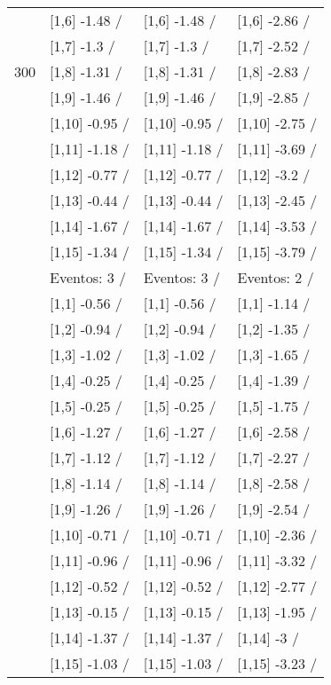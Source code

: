 \begin{table}
\begin{tabular}[t]{llll}
 & {}[1,6] -1.48  / & {}[1,6] -1.48  / & {}[1,6] -2.86  /\\
 & {}[1,7] -1.3  / & {}[1,7] -1.3  / & {}[1,7] -2.52  /\\
300 & {}[1,8] -1.31  / & {}[1,8] -1.31  / & {}[1,8] -2.83  /\\
\addlinespace
 & {}[1,9] -1.46  / & {}[1,9] -1.46  / & {}[1,9] -2.85  /\\
 & {}[1,10] -0.95  / & {}[1,10] -0.95  / & {}[1,10] -2.75  /\\
 & {}[1,11] -1.18  / & {}[1,11] -1.18  / & {}[1,11] -3.69  /\\
 & {}[1,12] -0.77  / & {}[1,12] -0.77  / & {}[1,12] -3.2  /\\
 & {}[1,13] -0.44  / & {}[1,13] -0.44  / & {}[1,13] -2.45  /\\
\addlinespace
 & {}[1,14] -1.67  / & {}[1,14] -1.67  / & {}[1,14] -3.53  /\\
 & {}[1,15] -1.34  / & {}[1,15] -1.34  / & {}[1,15] -3.79  /\\
 & Eventos:  3 / & Eventos:  3 / & Eventos:  2 /\\
 & {}[1,1] -0.56  / & {}[1,1] -0.56  / & {}[1,1] -1.14  /\\
 & {}[1,2] -0.94  / & {}[1,2] -0.94  / & {}[1,2] -1.35  /\\
\addlinespace
 & {}[1,3] -1.02  / & {}[1,3] -1.02  / & {}[1,3] -1.65  /\\
 & {}[1,4] -0.25  / & {}[1,4] -0.25  / & {}[1,4] -1.39  /\\
 & {}[1,5] -0.25  / & {}[1,5] -0.25  / & {}[1,5] -1.75  /\\
 & {}[1,6] -1.27  / & {}[1,6] -1.27  / & {}[1,6] -2.58  /\\
 & {}[1,7] -1.12  / & {}[1,7] -1.12  / & {}[1,7] -2.27  /\\
\addlinespace
500 & {}[1,8] -1.14  / & {}[1,8] -1.14  / & {}[1,8] -2.58  /\\
 & {}[1,9] -1.26  / & {}[1,9] -1.26  / & {}[1,9] -2.54  /\\
 & {}[1,10] -0.71  / & {}[1,10] -0.71  / & {}[1,10] -2.36  /\\
 & {}[1,11] -0.96  / & {}[1,11] -0.96  / & {}[1,11] -3.32  /\\
 & {}[1,12] -0.52  / & {}[1,12] -0.52  / & {}[1,12] -2.77  /\\
\addlinespace
 & {}[1,13] -0.15  / & {}[1,13] -0.15  / & {}[1,13] -1.95  /\\
 & {}[1,14] -1.37  / & {}[1,14] -1.37  / & {}[1,14] -3  /\\
 & {}[1,15] -1.03  / & {}[1,15] -1.03  / & {}[1,15] -3.23  /\\
\bottomrule
\end{tabular}
\end{table}
